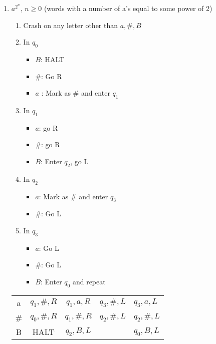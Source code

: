 \documentclass[12pt]{scrbook}
\begin{document}
\begin{enumerate}
\begin{enumerate}
        \item $a^{2^n}$, $n \geq 0$ (words with a number of a's equal to some power of 2)

          \begin{enumerate}
            \item Crash on any letter other than $a, \#, B$
            \item In $q_0$
              \begin{itemize}
                \item $B$: HALT
                \item \#: Go R
                \item $a$ : Mark as \# and enter $q_1$
              \end{itemize}
            \item In $q_1$
              \begin{itemize}
              \item $a$: go R
              \item \#: go R
              \item $B$: Enter $q_2$, go L
              \end{itemize}
            \item In $q_2$
              \begin{itemize}
              \item $a$: Mark as \# and enter $q_3$
              \item \#: Go L
              \end{itemize}
            \item In $q_3$
              \begin{itemize}
              \item $a$: Go L
              \item \#: Go L
              \item $B$: Enter $q_0$ and repeat
              \end{itemize}
          \end{enumerate}

          \begin{table}[H]
          \begin{tabular}{c | c | c | c}
            a & $q_1, \#, R$ & $q_1, a, R$ & $q_3, \#, L$ & $q_3, a, L$   \\
            \# & $q_0, \#, R$ & $q_1, \#, R$ &  $q_2, \#, L$  & $q_2, \#, L$  \\
            B & HALT &  $q_2, B, L$ &  & $q_0, B, L$
          \end{tabular}
        \end{table}


\end{enumerate}
\end{enumerate}
\end{document}
